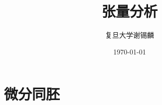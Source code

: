 \documentclass[oneside]{book}
\title{
	\vspace{-4 cm} \color{Sienna} \Huge 张量分析
}
\author{
	\CJKfamily{楷体} \color{DarkRed} \Large 复旦大学\phantom{空格}谢锡麟
}
\date{
	\CJKfamily{楷体} \color{Goldenrod} \Large \today
}
\theoremstyle{nonumberplain} %
\begin{document}
%	
%	
%		
%	
%		
	
	\chapter{微分同胚}
		
%		
\end{document}
